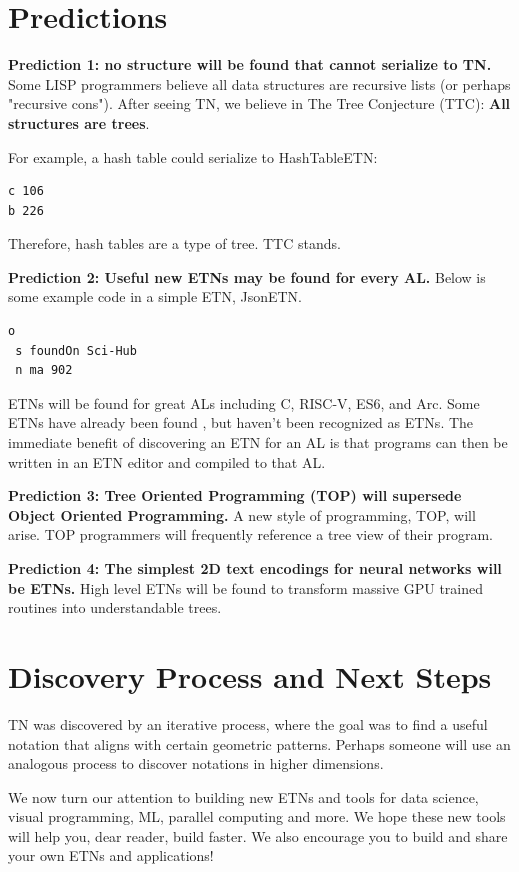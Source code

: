 \documentclass[journal]{IEEEtran}
\begin{document}
\section{Predictions}

\textbf{Prediction 1: no structure will be found that cannot serialize to TN.} Some LISP programmers believe all data structures are recursive lists (or perhaps "recursive cons"). After seeing TN, we believe in The Tree Conjecture (TTC): \textbf{All structures are trees}.

For example, a hash table could serialize to HashTableETN:

\begin{lstlisting}
c 106
b 226
\end{lstlisting}

Therefore, hash tables are a type of tree. TTC stands.

\textbf{Prediction 2: Useful new ETNs may be found for every AL.} Below is some example code in a simple ETN, JsonETN.

\begin{lstlisting}
o
 s foundOn Sci-Hub
 n ma 902
\end{lstlisting}

ETNs will be found for great ALs including C, RISC-V, ES6, and Arc. Some ETNs have already been found \cite{Roughan}, but haven't been recognized as ETNs. The immediate benefit of discovering an ETN for an AL is that programs can then be written in an ETN editor and compiled to that AL.

\textbf{Prediction 3: Tree Oriented Programming (TOP) will supersede Object Oriented Programming.} A new style of programming, TOP, will arise. TOP programmers will frequently reference a tree view of their program.

\textbf{Prediction 4: The simplest 2D text encodings for neural networks will be ETNs.} High level ETNs will be found to transform massive GPU trained routines into understandable trees.

\section{Discovery Process and Next Steps}

TN was discovered by an iterative process, where the goal was to find a useful notation that aligns with certain geometric patterns. Perhaps someone will use an analogous process to discover notations in higher dimensions.

We now turn our attention to building new ETNs and tools for data science, visual programming, ML, parallel computing and more. We hope these new tools will help you, dear reader, build faster. We also encourage you to build and share your own ETNs and applications!
\end{document}

